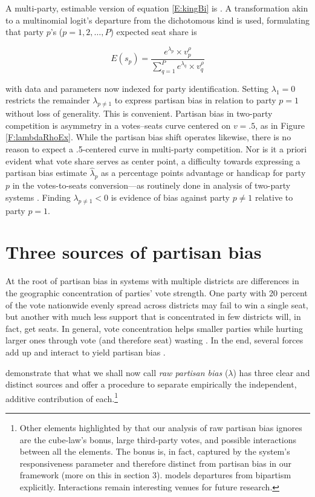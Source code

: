\documentclass[letter,12pt]{article}
\begin{document}
A multi-party, estimable version of equation \ref{E:kingBi} is \citet{king.1990elRespBiasMultiparty} \citep[another is][]{calvo.micozzi.govReform.2005}. A transformation akin to a multinomial logit's departure from the dichotomous kind is used, formulating that party $p$'s ($p=1,2,\ldots,P$) expected seat share is 

\begin{equation}\label{E:kingMulti}
 E(s_p) = \frac{e^{\lambda_p} \times v_p^\rho}{\sum_{q=1}^{P} e^{\lambda_q} \times v_q^\rho}
\end{equation}

\noindent with data and parameters now indexed for party identification. Setting $\lambda_1 = 0$ restricts the remainder $\lambda_{p \neq 1}$ to express partisan bias in relation to party $p=1$ without loss of generality. This is convenient. Partisan bias in two-party competition is asymmetry in a votes--seats curve centered on $v=.5$, as in Figure \ref{F:lambdaRhoEx}. While the partisan bias shift operates likewise, there is no reason to expect a .5-centered curve in multi-party competition. Nor is it a priori evident what vote share serves as center point, a difficulty towards expressing a partisan bias estimate $\hat{\lambda}_p$ as a percentage points advantage or handicap for party $p$ in the votes-to-seats conversion---as routinely done in analysis of two-party systems \citep[e.g.,][]{cox.katz.2002}. Finding $\lambda_{p \neq 1}<0$ is evidence of bias against party $p \neq 1$ relative to party $p=1$.

\section{Three sources of partisan bias}

At the root of partisan bias in systems with multiple districts are differences in the geographic concentration of parties' vote strength. One party with 20 percent of the vote nationwide evenly spread across districts may fail to win a single seat, but another with much less support that is concentrated in few districts will, in fact, get seats. In general, vote concentration helps smaller parties while hurting larger ones through vote (and therefore seat) wasting \citep{calvo.roddenMultipartyPlurality2015}. In the end, several forces add up and interact to yield partisan bias \citep{gudgin.taylor.1980decomposeBias}. 

\citet[][, henceforth GKB]{grofman.etalBiasMalapp.1997} demonstrate that what we shall now call \emph{raw partisan bias} ($\lambda$) has three clear and distinct sources and offer a procedure to separate empirically the independent, additive contribution of each.\footnote{Other elements highlighted by \citet{gudgin.taylor.1980decomposeBias} that our analysis of raw partisan bias ignores are the cube-law's bonus, large third-party votes, and possible interactions between all the elements. The bonus is, in fact, captured by the system's responsiveness parameter and therefore distinct from partisan bias in our framework (more on this in section 3). \citet{calvo.2009roadToPR} models departures from bipartism explicitly. Interactions remain interesting venues for future research.} 
\end{document}
